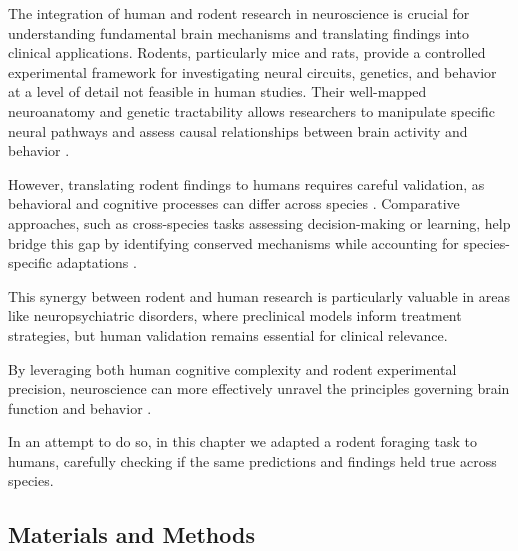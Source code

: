 \documentclass[11pt]{article}
\begin{document}
The integration of human and rodent research in neuroscience is crucial for understanding fundamental brain mechanisms and translating findings into clinical applications. Rodents, particularly mice and rats, provide a controlled experimental framework for investigating neural circuits, genetics, and behavior at a level of detail not feasible in human studies. Their well-mapped neuroanatomy and genetic tractability allows researchers to manipulate specific neural pathways and assess causal relationships between brain activity and behavior \cite{gomez2019life}.

However, translating rodent findings to humans requires careful validation, as behavioral and cognitive processes can differ across species \cite{charvet2025translating}. Comparative approaches, such as cross-species tasks assessing decision-making or learning, help bridge this gap by identifying conserved mechanisms while accounting for species-specific adaptations \cite{vertechi2020inference}.

This synergy between rodent and human research is particularly valuable in areas like neuropsychiatric disorders, where preclinical models inform treatment strategies, but human validation remains essential for clinical relevance.

By leveraging both human cognitive complexity and rodent experimental precision, neuroscience can more effectively unravel the principles governing brain function and behavior \cite{krakauer2017neuroscience}.

In an attempt to do so, in this chapter we adapted a rodent foraging task to humans, carefully checking if the same predictions and findings held true across species.


\subsection{Materials and Methods}
\end{document}
